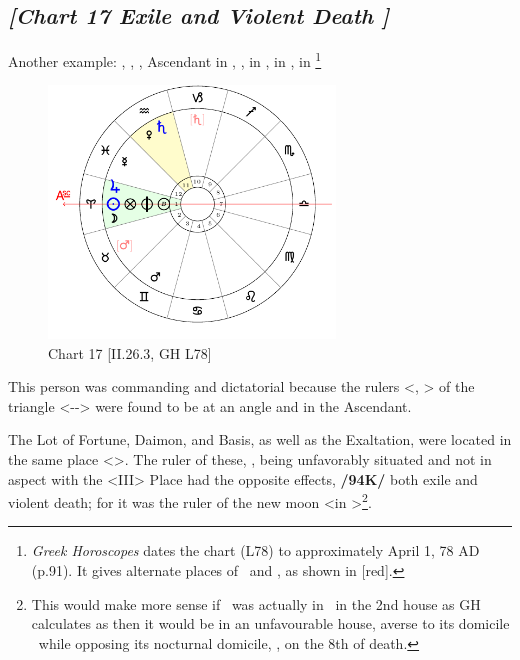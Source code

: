 \subsection*{\textit{[Chart 17 Exile and Violent Death ]}}

Another example: \Sun, \Moon, \Jupiter, Ascendant in \Aries, \Saturn, \Venus in \Aquarius, \Mars\xspace in \Gemini, \Mercury\xspace in \Pisces
\footnote{\textit{Greek Horoscopes} dates the chart (L78) to approximately April 1, 78 AD (p.91). It gives alternate places of \Mars\, and \Saturn, as shown in \textcolor{red!50}{[red]}.}

\clearpage
\begin{figure}
\centering
\vspace{-20pt}
\includegraphics[width=0.68\textwidth]{charts/2_26_3}
\caption{Chart 17 [II.26.3, GH L78]}
\label{fig:chart17}
\end{figure}

This person was commanding and dictatorial because the rulers <\Sun, \Jupiter> of the triangle <\Aries-\Leo-\Sagittarius> were found to be at an angle and in the Ascendant. 

The Lot of Fortune, Daimon, and Basis, as well as the Exaltation, were located in the same place <\Aries>. The ruler of these, \Mars, being unfavorably situated and not in aspect with the <III> Place had the opposite effects, \textbf{/94K/} both exile and violent death; for it was the ruler of the new moon <in \Aries>\footnote{This would make more sense if \Mars\, was actually in \Taurus\, in the 2nd house as GH calculates as then it would be in an unfavourable house, averse to its domicile \Aries\, while opposing its nocturnal domicile, \Scorpio, on the 8th of death.}.

